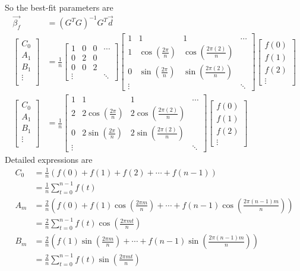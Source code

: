 So the best-fit parameters are
\begin{align*}
\vec{\beta_f} &= (G^TG)^{-1}G^T\vec{d} \\
\begin{bmatrix}
C_0 \\
A_1 \\
B_1 \\
\vdots \\
\end{bmatrix}
&= \frac{1}{n} 
\begin{bmatrix}
1 & 0 & 0 & \cdots \\
0 & 2 & 0 & \\
0 & 0 & 2 & \\
\vdots & & & \ddots
\end{bmatrix} 
\begin{bmatrix}
1 & 1 & 1 & \cdots \\
1 & \cos(\frac{2\pi}{n}) & \cos(\frac{2\pi(2)}{n}) & \\
0 & \sin(\frac{2\pi}{n}) & \sin(\frac{2\pi(2)}{n}) &  \\
\vdots & & & \ddots
\end{bmatrix}
\begin{bmatrix}
f(0)\\
f(1)\\
f(2)\\
\vdots
\end{bmatrix} \\
\begin{bmatrix}
C_0 \\
A_1 \\
B_1 \\
\vdots \\
\end{bmatrix}
&= 
\frac{1}{n}
\begin{bmatrix}
1 & 1 & 1 & \cdots \\
2 & 2\cos(\frac{2\pi}{n}) & 2\cos(\frac{2\pi(2)}{n}) & \\
0 & 2\sin(\frac{2\pi}{n}) & 2\sin(\frac{2\pi(2)}{n}) &  \\
\vdots & & & \ddots
\end{bmatrix}
\begin{bmatrix}
f(0)\\
f(1)\\
f(2)\\
\vdots
\end{bmatrix} 
\end{align*}
Detailed expressions are
\begin{align*}
C_0 &= \frac{1}{n}(f(0) + f(1) + f(2) + \cdots + f(n-1)) \\
&= \frac{1}{n}\sum_{t=0}^{n-1} f(t) \\
A_m &= \frac{2}{n}(f(0) + f(1)\cos(\frac{2\pi m}{n}) + \cdots + f(n-1)\cos(\frac{2\pi (n-1)m}{n})) \\
&= \frac{2}{n}\sum_{t=0}^{n-1} f(t)\cos(\frac{2\pi mt}{n}) \\
B_m &= \frac{2}{n}(f(1)\sin(\frac{2\pi m}{n}) + \cdots + f(n-1)\sin(\frac{2\pi (n-1)m}{n})) \\
&= \frac{2}{n}\sum_{t=0}^{n-1} f(t)\sin(\frac{2\pi mt}{n})
\end{align*}

